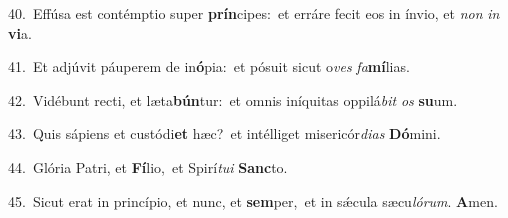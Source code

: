 {\numbfont\textcolor{\numbcolor}{40.}}~Effúsa est contémptio super \textbf{prín}\-cipes:~\star et erráre fecit eos in ínvio, et \textit{non} \textit{in} \textbf{vi}\-a.\par
{\numbfont\textcolor{\numbcolor}{41.}}~Et adjúvit páuperem de in\-\textbf{ó}\-pia:~\star et pósuit sicut o\textit{ves} \textit{fa}\-\textbf{mí}lias.\par
{\numbfont\textcolor{\numbcolor}{42.}}~Vidébunt recti, et læta\-\textbf{bún}\-tur:~\star et omnis iníquitas oppilá\textit{bit} \textit{os} \textbf{su}\-um.\par
{\numbfont\textcolor{\numbcolor}{43.}}~Quis sápiens et custódi\textbf{et} hæc?~\star et intélliget misericór\-\textit{di}\-\textit{as} \textbf{Dó}\-mini.\par
{\numbfont\textcolor{\numbcolor}{44.}}~Glória Patri, et \textbf{Fí}\-lio,~\star et Spirí\-\textit{tu}\-\textit{i} \textbf{Sanc}\-to.\par
{\numbfont\textcolor{\numbcolor}{45.}}~Sicut erat in princípio, et nunc, et \textbf{sem}\-per,~\star et in sǽcula sæcu\-\textit{ló}\-\textit{rum}. \textbf{A}\-men.\par
